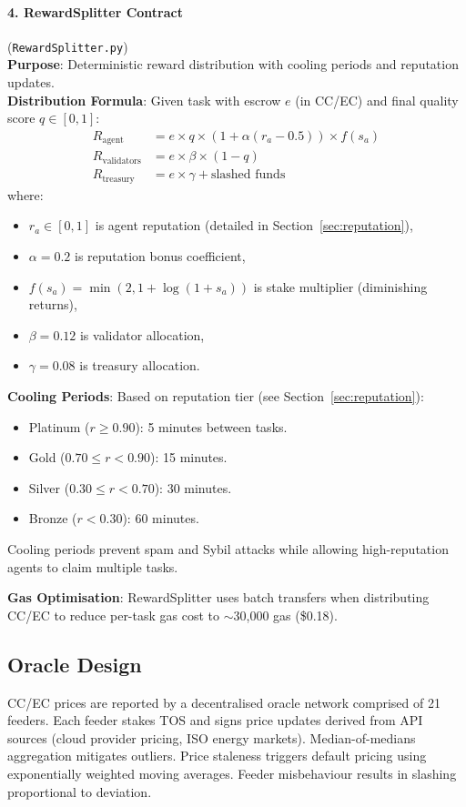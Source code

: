 \documentclass[11pt]{article}
\begin{document}
\paragraph{4. RewardSplitter Contract} (\texttt{RewardSplitter.py})\\
\textbf{Purpose}: Deterministic reward distribution with cooling periods and reputation updates.\\
\textbf{Distribution Formula}: Given task with escrow $e$ (in CC/EC) and final quality score $q \in [0,1]$:
\begin{align}
R_{\text{agent}} &= e \times q \times \left(1 + \alpha (r_a - 0.5)\right) \times f(s_a) \label{eq:reward-agent} \\
R_{\text{validators}} &= e \times \beta \times (1-q) \label{eq:reward-validators} \\
R_{\text{treasury}} &= e \times \gamma + \text{slashed funds} \label{eq:reward-treasury}
\end{align}
where:
\begin{itemize}[noitemsep]
  \item $r_a \in [0,1]$ is agent reputation (detailed in Section~\ref{sec:reputation}),
  \item $\alpha = 0.2$ is reputation bonus coefficient,
  \item $f(s_a) = \min(2, 1 + \log(1+s_a))$ is stake multiplier (diminishing returns),
  \item $\beta = 0.12$ is validator allocation,
  \item $\gamma = 0.08$ is treasury allocation.
\end{itemize}
\textbf{Cooling Periods}: Based on reputation tier (see Section~\ref{sec:reputation}):
\begin{itemize}[noitemsep]
  \item Platinum ($r \geq 0.90$): 5 minutes between tasks.
  \item Gold ($0.70 \leq r < 0.90$): 15 minutes.
  \item Silver ($0.30 \leq r < 0.70$): 30 minutes.
  \item Bronze ($r < 0.30$): 60 minutes.
\end{itemize}
Cooling periods prevent spam and Sybil attacks while allowing high-reputation agents to claim multiple tasks.

\textbf{Gas Optimisation}: RewardSplitter uses batch transfers when distributing CC/EC to reduce per-task gas cost to $\sim$30,000 gas (\$0.18).

\subsection{Oracle Design}
CC/EC prices are reported by a decentralised oracle network comprised of 21 feeders. Each feeder stakes TOS and signs price updates derived from API sources (cloud provider pricing, ISO energy markets). Median-of-medians aggregation mitigates outliers. Price staleness triggers default pricing using exponentially weighted moving averages. Feeder misbehaviour results in slashing proportional to deviation.
\end{document}
